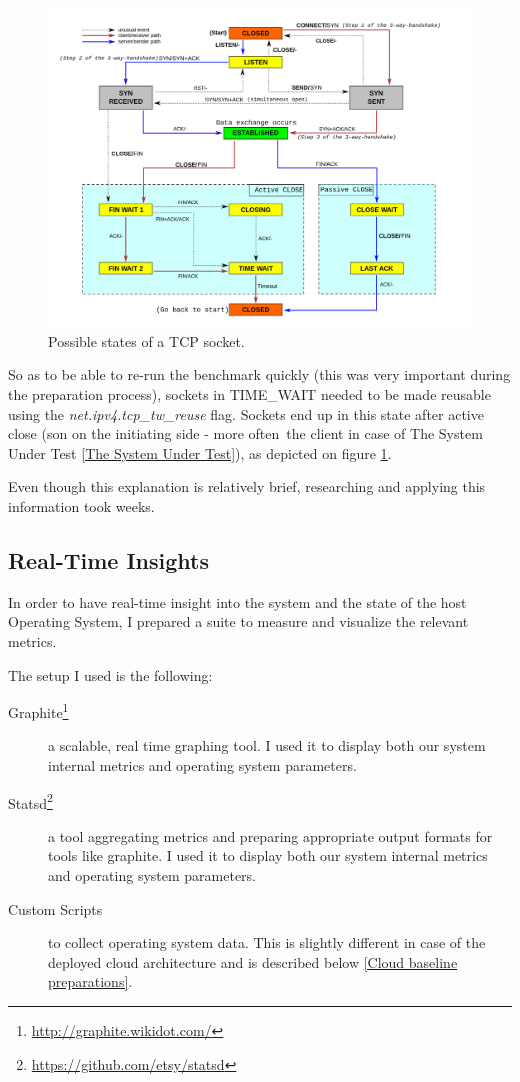 \documentclass{uvamscse}
\begin{document}
\begin{figure}[H]
\centering
\includegraphics[scale=0.2]{tcpstates}
\caption{Possible states of a TCP socket.}
\label{figure:tcpstates}
\end{figure}

So as to be able to re-run the benchmark quickly (this was very important during the preparation process), sockets in TIME\_WAIT needed to be made reusable using the \textit{net.ipv4.tcp\_tw\_reuse} flag. Sockets end up in this state after active close (son on the initiating side - more often the client in case of The System Under Test \ref{The System Under Test}), as depicted on figure \ref{figure:tcpstates}.

Even though this explanation is relatively brief, researching and applying this information took weeks.

\subsection{Real-Time Insights}

In order to have real-time insight into the system and the state of the host Operating System, I prepared a suite to measure and visualize the relevant metrics.

The setup I used is the following:
\begin{description}
  \item[Graphite\footnote{\url{http://graphite.wikidot.com/}}] a scalable, real time graphing tool. I used it to display both our system internal metrics and operating system parameters.
  \item[Statsd\footnote{\url{https://github.com/etsy/statsd}}] a tool aggregating metrics and preparing appropriate output formats for tools like graphite. I used it to display both our system internal metrics and operating system parameters.
  \item[Custom Scripts] to collect operating system data. This is slightly different in case of the deployed cloud architecture and is described below \ref{Cloud baseline preparations}.
\end{description}
\end{document}
